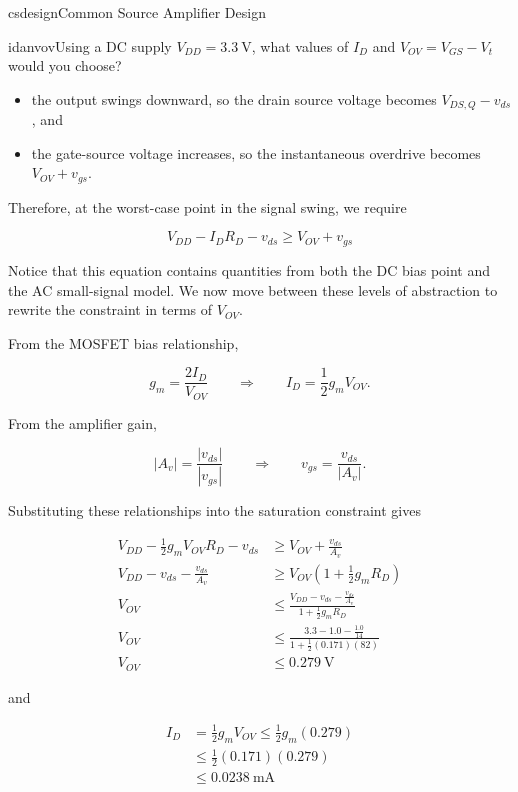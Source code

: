 \begin{mainquestion}{csdesign}{Common Source Amplifier Design}
\begin{partquestion}{idanvov}{Using a DC supply $V_{DD} = \qty{3.3}{\volt}$, what values of $I_{D}$ and $V_{OV} = V_{GS} - V_{t}$ would you choose?}
\begin{answer}
\begin{kaitlyn}
\begin{itemize}
    \item the output swings downward, so the drain source voltage becomes $V_{DS,Q}-v_{ds}$, and
    \item the gate-source voltage increases, so the instantaneous overdrive becomes $V_{OV}+v_{gs}$.

\end{itemize}

Therefore, at the worst-case point in the signal swing, we require

\[\boxed{V_{DD} - I_D R_D - v_{ds}\geq V_{OV} + v_{gs} }\]

Notice that this equation contains quantities from both the DC bias point and the AC small-signal model. We now move between these levels of abstraction to rewrite the constraint in terms of $V_{OV}$.

From the MOSFET bias relationship,

\[ g_m = \frac{2I_D}{V_{OV}} \qquad\Rightarrow\qquad I_D = \frac{1}{2}g_mV_{OV}.\]

From the amplifier gain,

\[ |A_v| = \frac{|v_{ds}|}{|v_{gs}|} \qquad\Rightarrow\qquad v_{gs} = \frac{v_{ds}}{|A_v|}.\]

Substituting these relationships into the saturation constraint gives
\end{kaitlyn}

\begin{align*}
V_{DD} - \frac{1}{2}g_{m}V_{OV}R_{D} - v_{ds} &\geq V_{OV} + \frac{v_{ds}}{A_{v}} \\
V_{DD} - v_{ds} - \frac{v_{ds}}{A_{v}} &\geq V_{OV}\left(1 + \frac{1}{2}g_{m}R_{D}\right) \\
V_{OV} &\leq \frac{V_{DD} - v_{ds} - \frac{v_{ds}}{A_{v}}}{1 + \frac{1}{2}g_{m}R_{D}}\\
V_{OV} &\leq \frac{3.3 - 1.0 - \frac{1.0}{14}}{1 + \frac{1}{2}(0.171)(82)}\\
V_{OV} &\leq \qty{0.279}{\volt}
\end{align*}

and

\begin{align*}
    I_D &= \frac{1}{2} g_m V_{OV} \leq \frac{1}{2} g_m (0.279) \\
    &\leq \frac{1}{2} (0.171)(0.279) \\
    &\leq \qty{0.0238}{\milli\ampere} \\
\end{align*}


\end{answer}
\end{partquestion}
\end{mainquestion}
